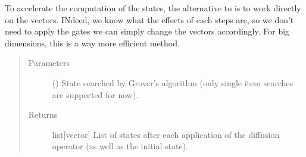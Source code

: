 \documentclass[letterpaper,10pt,english]{sphinxmanual}
\begin{document}
\begin{fulllineitems}
\label{\detokenize{grover:grover.grover_artifical}}
To accelerate the computation of the states, the alternative to 
 is to work directly on the vectors. INdeed, we know what 
the effects of each steps are, so we don’t need to apply the gates we can 
simply change the vectors accordingly. For big dimensions, this is a way more 
efficient method.
\begin{quote}\begin{description}
\item[{Parameters}] \leavevmode
{} (\sphinxstyleliteralemphasis{\sphinxupquote{{[}}}\sphinxstyleliteralemphasis{\sphinxupquote{{]}}}) \textendash{} State searched by Grover’s algorithm 
(only single item searches are supported for now).

\item[{Returns}] \leavevmode
list{[}vector{]} \textendash{} List of states after each application of the 
diffusion operator (as well as the initial state).

\end{description}\end{quote}

\end{fulllineitems}

\end{document}
